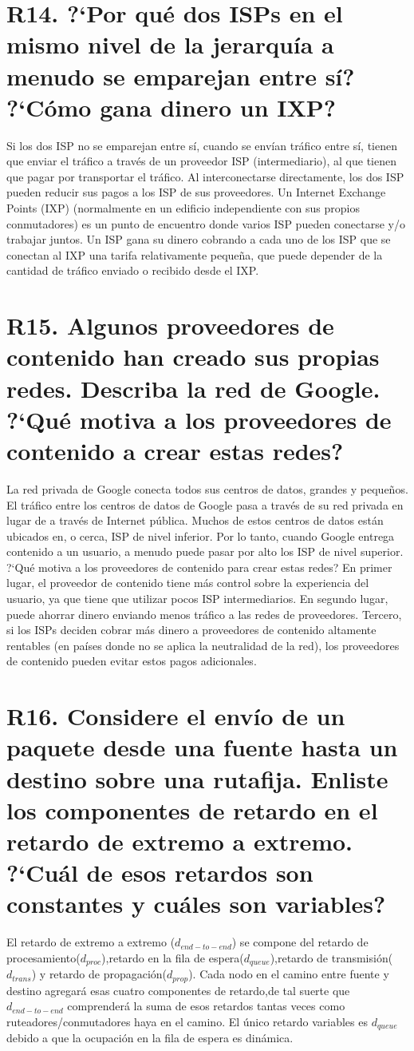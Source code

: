 \documentclass[a4paper, 11pt]{article}
\theoremstyle{definition} \theoremstyle{remark}
\begin{document}
     \section{R14. ?`Por qu\'e dos ISPs en el mismo nivel de la jerarqu\'ia a menudo se emparejan entre s\'i? ?`C\'omo gana dinero un IXP?}
     Si los dos ISP no se emparejan entre s\'i, cuando se env\'ian tr\'afico entre s\'i, tienen que enviar el tr\'afico a trav\'es de un proveedor ISP (intermediario), al que tienen que pagar por transportar el tr\'afico. Al interconectarse directamente, los dos ISP pueden reducir sus pagos a los ISP de sus proveedores. Un Internet Exchange Points (IXP) (normalmente en un edificio independiente con sus propios conmutadores) es un punto de encuentro donde varios ISP pueden conectarse y/o trabajar juntos. Un ISP gana su dinero cobrando a cada uno de los ISP que se conectan al IXP una tarifa relativamente peque\~{n}a, que puede depender de la cantidad de tr\'afico enviado o recibido desde el IXP.

     \section{R15. Algunos proveedores de contenido han creado sus propias redes. Describa la red de Google. ?`Qu\'e motiva a los proveedores de contenido a crear estas redes?}
     La red privada de Google conecta todos sus centros de datos, grandes y peque\~{n}os. El tr\'afico entre los centros de datos de Google pasa a trav\'es de su red privada en lugar de a trav\'es de Internet p\'ublica. Muchos de estos centros de datos est\'an ubicados en, o cerca, ISP de nivel inferior. Por lo tanto, cuando Google entrega contenido a un usuario, a menudo puede pasar por alto los ISP de nivel superior. ?`Qu\'e motiva a los proveedores de contenido para crear estas redes? En primer lugar, el proveedor de contenido tiene m\'as control sobre la experiencia del usuario, ya que tiene que utilizar pocos ISP intermediarios. En segundo lugar, puede ahorrar dinero enviando menos tr\'afico a las redes de proveedores. Tercero, si los ISPs deciden cobrar m\'as dinero a proveedores de contenido altamente rentables (en pa\'ises donde no se aplica la neutralidad de la red), los proveedores de contenido pueden evitar estos pagos adicionales.

     \section{R16. Considere el env\'io de un paquete desde una fuente hasta un destino sobre una rutafija. Enliste los componentes de retardo en el retardo de extremo a extremo. ?`Cu\'al de esos retardos son constantes y cu\'ales son variables?}
     El retardo de extremo a extremo ($d_{end-to-end}$) se compone del retardo de procesamiento($d_{proc}$),retardo en la fila de espera($d_{queue}$),retardo de transmisi\'on($d_{trans}$) y retardo de propagaci\'on($d_{prop}$). Cada nodo en el camino entre fuente y destino agregar\'a esas cuatro componentes de retardo,de tal suerte que $d_{end-to-end}$ comprender\'a la suma de esos retardos tantas veces como ruteadores/conmutadores haya en el camino. El \'unico retardo variables es $d_{queue}$ debido a que la ocupaci\'on en la fila de espera es din\'amica.
\end{document}
